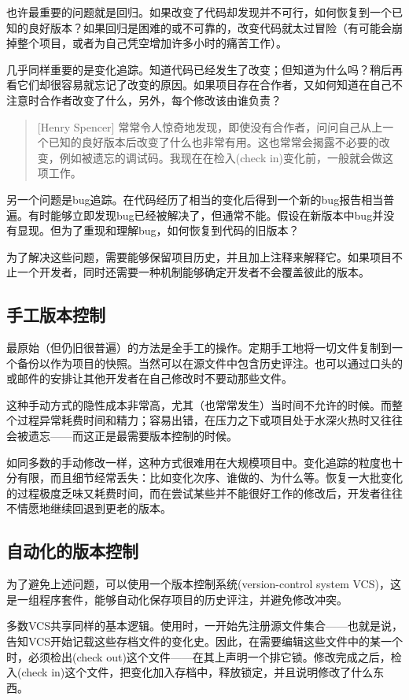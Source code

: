 \documentclass[12pt,oneside]{ctexbook}
\begin{document}
\begin{common-format}
也许最重要的问题就是回归。如果改变了代码却发现并不可行，如何恢复到一个已知的良好版本？如果回归是困难的或不可靠的，改变代码就太过冒险（有可能会崩掉整个项目，或者为自己凭空增加许多小时的痛苦工作）。

几乎同样重要的是变化追踪。知道代码已经发生了改变；但知道为什么吗？稍后再看它们却很容易就忘记了改变的原因。如果项目存在合作者，又如何知道在自己不注意时合作者改变了什么，另外，每个修改该由谁负责？

\begin{quote}[Henry Spencer]
常常令人惊奇地发现，即使没有合作者，问问自己从上一个已知的良好版本后改变了什么也非常有用。这也常常会揭露不必要的改变，例如被遗忘的调试码。我现在在检入(check in)变化前，一般就会做这项工作。
\end{quote}

另一个问题是bug追踪。在代码经历了相当的变化后得到一个新的bug报告相当普遍。有时能够立即发现bug已经被解决了，但通常不能。假设在新版本中bug并没有显现。但为了重现和理解bug，如何恢复到代码的旧版本？

为了解决这些问题，需要能够保留项目历史，并且加上注释来解释它。如果项目不止一个开发者，同时还需要一种机制能够确定开发者不会覆盖彼此的版本。

\subsection{手工版本控制}
最原始（但仍旧很普遍）的方法是全手工的操作。定期手工地将一切文件复制到一个备份以作为项目的快照。当然可以在源文件中包含历史评注。也可以通过口头的或邮件的安排让其他开发者在自己修改时不要动那些文件。

这种手动方式的隐性成本非常高，尤其（也常常发生）当时间不允许的时候。而整个过程异常耗费时间和精力；容易出错，在压力之下或项目处于水深火热时又往往会被遗忘——而这正是最需要版本控制的时候。

如同多数的手动修改一样，这种方式很难用在大规模项目中。变化追踪的粒度也十分有限，而且细节经常丢失：比如变化次序、谁做的、为什么等。恢复一大批变化的过程极度乏味又耗费时间，而在尝试某些并不能很好工作的修改后，开发者往往不情愿地继续回退到更老的版本。


\subsection{自动化的版本控制}
为了避免上述问题，可以使用一个版本控制系统(version-control system VCS)，这是一组程序套件，能够自动化保存项目的历史评注，并避免修改冲突。

多数VCS共享同样的基本逻辑。使用时，一开始先注册源文件集合——也就是说，告知VCS开始记载这些存档文件的变化史。因此，在需要编辑这些文件中的某一个时，必须检出(check out)这个文件——在其上声明一个排它锁。修改完成之后，检入(check in)这个文件，把变化加入存档中，释放锁定，并且说明修改了什么东西。


\end{common-format}
\end{document}
